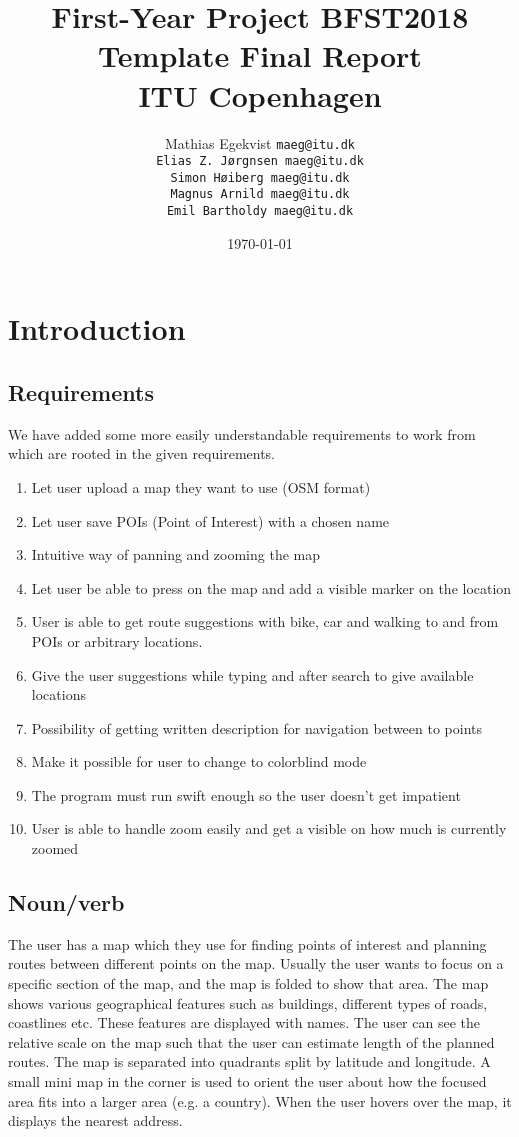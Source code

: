 \documentclass[11pt]{article}
\title{First-Year Project BFST2018\\Template Final Report\\ITU Copenhagen}
\author{Mathias Egekvist \tt{maeg@itu.dk}\\
Elias Z. Jørgnsen \tt{maeg@itu.dk}\\
Simon Høiberg \tt{maeg@itu.dk} \\
Magnus Arnild \tt{maeg@itu.dk} \\
Emil Bartholdy \tt{maeg@itu.dk}}
\date{\today}
\begin{document}
\maketitle

\section{Introduction}

\subsection{Requirements}

We have added some more easily understandable requirements to work from which are rooted in the given requirements.
\begin{enumerate}
  \item Let user upload a map they want to use (OSM format)
  \item Let user save POIs (Point of Interest) with a chosen name
  \item Intuitive way of panning and zooming the map
  \item Let user be able to press on the map and add a visible marker on the location
  \item User is able to get route suggestions with bike, car and walking to and from POIs or arbitrary locations.
  \item Give the user suggestions while typing and after search to give available locations
  \item Possibility of getting written description for navigation between to points
  \item Make it possible for user to change to colorblind mode
  \item The program must run swift enough so the user doesn't get impatient
  \item User is able to handle zoom easily and get a visible on how much is currently zoomed


\end{enumerate}

\subsection{Noun/verb}
The user has a map which they use for finding points of interest and planning routes between different points on the map. Usually the user wants to focus on a specific section of the map, and the map is folded to show that area. The map shows various geographical features such as buildings, different types of roads, coastlines etc. These features are displayed with names. The user can see the relative scale on the map such that the user can estimate length of the planned routes. The map is separated into quadrants split by latitude and longitude. A small mini map in the corner is used to orient the user about how the focused area fits into a larger area (e.g. a country). When the user hovers over the map, it displays the nearest address.
\end{document}
